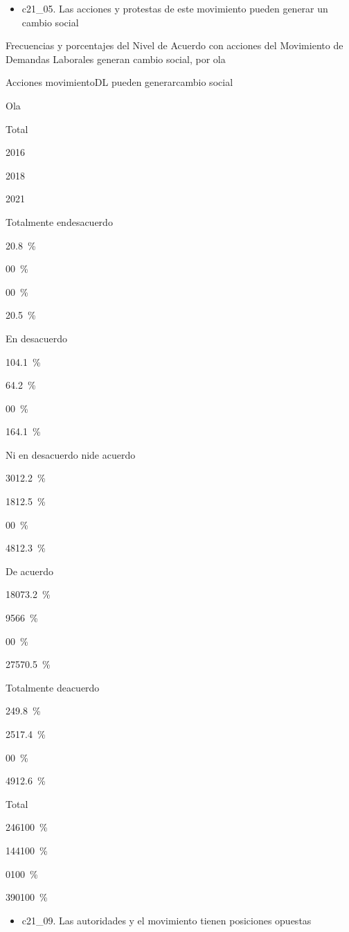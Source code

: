 \documentclass[
  12pt,
]{book}
\providecommand{\tightlist}{%
  \setlength{\itemsep}{0pt}\setlength{\parskip}{0pt}}
\begin{document}
\begin{itemize}
\tightlist
\item
  c21\_05. Las acciones y protestas de este movimiento pueden generar un cambio social
\end{itemize}

Frecuencias y porcentajes del Nivel de Acuerdo con acciones del Movimiento de Demandas Laborales generan cambio social, por ola

Acciones movimientoDL pueden generarcambio social

Ola

Total

2016

2018

2021

Totalmente endesacuerdo

{2}{0.8~\%}

{0}{0~\%}

{0}{0~\%}

{2}{0.5~\%}

En desacuerdo

{10}{4.1~\%}

{6}{4.2~\%}

{0}{0~\%}

{16}{4.1~\%}

Ni en desacuerdo nide acuerdo

{30}{12.2~\%}

{18}{12.5~\%}

{0}{0~\%}

{48}{12.3~\%}

De acuerdo

{180}{73.2~\%}

{95}{66~\%}

{0}{0~\%}

{275}{70.5~\%}

Totalmente deacuerdo

{24}{9.8~\%}

{25}{17.4~\%}

{0}{0~\%}

{49}{12.6~\%}

Total

{246}{100~\%}

{144}{100~\%}

{0}{100~\%}

{390}{100~\%}

\begin{itemize}
\tightlist
\item
  c21\_09. Las autoridades y el movimiento tienen posiciones opuestas
\end{itemize}
\end{document}
